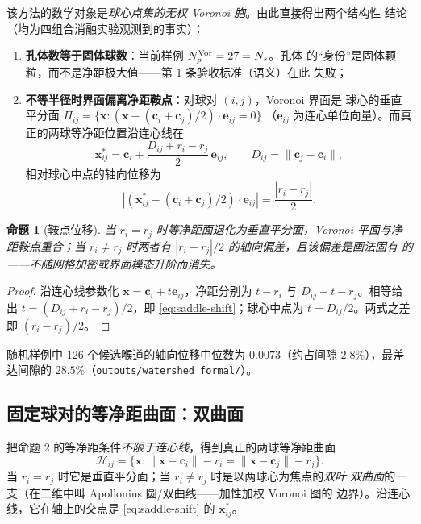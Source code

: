 \documentclass[UTF8,zihao=-4]{ctexart}
\newcommand{\cc}{\bm c}
\newtheorem{proposition}[definition]{命题}
\begin{document}
该方法的数学对象是\emph{球心点集的无权 Voronoi 胞}。由此直接得出两个结构性
结论（均为四组合消融实验观测到的事实）：
\begin{enumerate}
  \item \textbf{孔体数等于固体球数}：当前样例 $N_p^{\rm Vor}=27=N_s$。孔体
  的``身份''是固体颗粒，而不是净距极大值——第 1 条验收标准（语义）在此
  失败；
  \item \textbf{不等半径时界面偏离净距鞍点}：对球对 $(i,j)$，Voronoi 界面是
  球心的垂直平分面
  $\Pi_{ij}=\{\bm x:(\bm x-(\cc_i+\cc_j)/2)\cdot\bm e_{ij}=0\}$
  （$\bm e_{ij}$ 为连心单位向量）。而真正的两球等净距位置沿连心线在
  \begin{equation}\label{eq:saddle-shift}
    \bm x_{ij}^*=\cc_i+\frac{D_{ij}+r_i-r_j}{2}\,\bm e_{ij},
    \qquad D_{ij}=\|\cc_j-\cc_i\|,
  \end{equation}
  相对球心中点的轴向位移为
  \begin{equation}
    \left|(\bm x_{ij}^*-(\cc_i+\cc_j)/2)\cdot\bm e_{ij}\right|
    =\frac{|r_i-r_j|}{2}.
  \end{equation}
\end{enumerate}

\begin{proposition}[鞍点位移]
  当 $r_i=r_j$ 时等净距面退化为垂直平分面，Voronoi 平面与净距鞍点重合；当
  $r_i\ne r_j$ 时两者有 $|r_i-r_j|/2$ 的轴向偏差，且该偏差是\emph{画法固有}
  的——不随网格加密或界面模态升阶而消失。
\end{proposition}

\begin{proof}
  沿连心线参数化 $\bm x=\cc_i+t\bm e_{ij}$，净距分别为 $t-r_i$ 与
  $D_{ij}-t-r_j$。相等给出 $t=(D_{ij}+r_i-r_j)/2$，即
  \eqref{eq:saddle-shift}；球心中点为 $t=D_{ij}/2$。两式之差即
  $(r_i-r_j)/2$。
\end{proof}

随机样例中 126 个候选喉道的轴向位移中位数为 $0.0073$（约占间隙
$2.8\%$），最差达间隙的 $28.5\%$（\texttt{outputs/watershed\_formal/}）。

\subsection{固定球对的等净距曲面：双曲面}

把命题 2 的等净距条件\emph{不限于连心线}，得到真正的两球等净距曲面
\begin{equation}\label{eq:hyperboloid}
  \mathcal H_{ij}=\{\bm x:\|\bm x-\cc_i\|-r_i=\|\bm x-\cc_j\|-r_j\}.
\end{equation}
当 $r_i=r_j$ 时它是垂直平分面；当 $r_i\ne r_j$ 时是以两球心为焦点的\emph{双叶
双曲面}的一支（在二维中叫 Apollonius 圆/双曲线——加性加权 Voronoi 图的
边界）。沿连心线，它在轴上的交点是 \eqref{eq:saddle-shift} 的 $\bm x_{ij}^*$。
\end{document}
